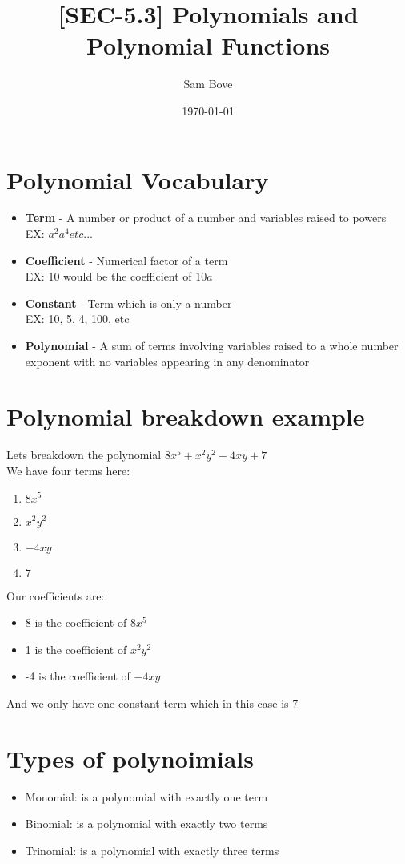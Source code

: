 \documentclass{article}
\title{[SEC-5.3] Polynomials and Polynomial Functions}
\author{Sam Bove}
\date{\today}
\begin{document}
\maketitle

\section{Polynomial Vocabulary}
\begin{itemize}
    \item \textbf{Term} - A number or product of a number and variables raised to powers \\ EX: $a^2 a^4 etc...$
    \item \textbf{Coefficient} - Numerical factor of a term \\ EX: 10 would be the coefficient of $10a$
    \item \textbf{Constant} - Term which is only a number \\ EX: 10, 5, 4, 100, etc
    \item \textbf{Polynomial} - A sum of terms involving variables raised to a whole number exponent with no variables appearing in any denominator     
\end{itemize}
\section{Polynomial breakdown example}
Lets breakdown the polynomial $8x^5 + x^2y^2 - 4xy + 7$ \\ We have four terms here:
\begin{enumerate}
    \item $8x^5$
    \item $x^2y^2$
    \item $-4xy$
    \item $7$
    \end{enumerate}
Our coefficients are:
\begin{itemize}
    \item 8 is the coefficient of $8x^5$
    \item 1 is the coefficient of $x^2y^2$
    \item -4 is the coefficient of $-4xy$
\end{itemize}
And we only have one constant term which in this case is 7
\section{Types of polynoimials}
\begin{itemize}
    \item Monomial: is a polynomial with exactly one term
    \item Binomial: is a polynomial with exactly two terms
    \item Trinomial: is a polynomial with exactly three terms
\end{itemize}
\end{document}
